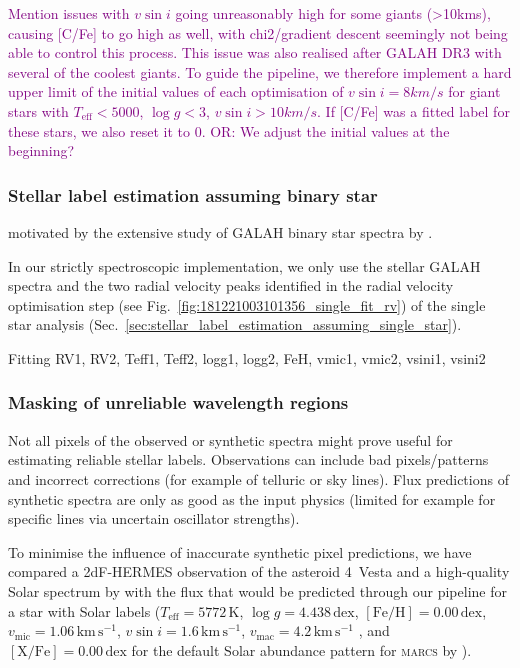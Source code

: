 \documentclass[
  journal=pasa,
  manuscript=research-paper, %
  year=2021,
  volume=37
]{cup-journal}
\newcommand{\SB}[1]{{\textcolor{purple}{#1}}}
\newcommand{\vsini}{$v \sin i$\xspace}
\newcommand{\marcs}{\textsc{marcs}\xspace}
\newcommand{\dex}{\,\mathrm{dex}}	%
\newcommand{\K}{\,\mathrm{K}}	%
\newcommand{\kms}{\,\mathrm{km\,s^{-1}}}	%
\begin{document}
\SB{Mention issues with \vsini going unreasonably high for some giants (>10kms), causing [C/Fe] to go high as well, with chi2/gradient descent seemingly not being able to control this process. This issue was also realised after GALAH DR3 with several of the coolest giants. To guide the pipeline, we therefore implement a hard upper limit of the initial values of each optimisation of $v \sin i = 8km/s$ for giant stars with $T_\text{eff} < 5000$, $\log g < 3$, $v \sin i > 10km/s$. If [C/Fe] was a fitted label for these stars, we also reset it to 0. OR: We adjust the initial values at the beginning?}

\subsubsection{Stellar label estimation assuming binary star} \label{sec:stellar_label_estimation_assuming_binary_star}


motivated by the extensive study of GALAH binary star spectra by \citet{Traven2020}.

In our strictly spectroscopic implementation, we only use the stellar GALAH spectra and the two radial velocity peaks identified in the radial velocity optimisation step (see Fig.~\ref{fig:181221003101356_single_fit_rv}) of the single star analysis (Sec.~\ref{sec:stellar_label_estimation_assuming_single_star}).

Fitting RV1, RV2, Teff1, Teff2, logg1, logg2, FeH, vmic1, vmic2, vsini1, vsini2

\subsubsection{Masking of unreliable wavelength regions} \label{sec:masking_of_unreliable_wavelength_regions}

Not all pixels of the observed or synthetic spectra might prove useful for estimating reliable stellar labels. Observations can include bad pixels/patterns and incorrect corrections (for example of telluric or sky lines). Flux predictions of synthetic spectra are only as good as the input physics (limited for example for specific lines via uncertain oscillator strengths).

To minimise the influence of inaccurate synthetic pixel predictions, we have compared a 2dF-HERMES observation of the asteroid 4~Vesta and a high-quality  Solar spectrum by \citet{Hinkle2000} with the flux that would be predicted through our pipeline for a star with Solar labels ($T_\text{eff} = 5772\K$, $\log g = 4.438\dex$, $\mathrm{[Fe/H]} = 0.00\dex$, $v_\text{mic} = 1.06\kms$, $v \sin i = 1.6\kms$, $v_\text{mac} = 4.2\kms$ \citep{Prsa2016, Jofre2017}, and $\mathrm{[X/Fe]} = 0.00\dex$ for the default Solar abundance pattern for \marcs by \citet{Grevesse2007}).
\end{document}

